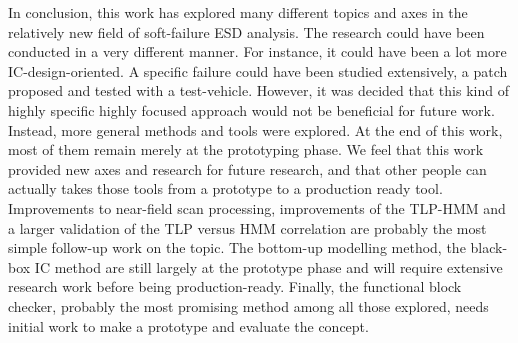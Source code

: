 In conclusion, this work has explored many different topics and axes in the relatively new field of soft-failure ESD analysis.
The research could have been conducted in a very different manner.
For instance, it could have been a lot more IC-design-oriented.
A specific failure could have been studied extensively, a patch proposed and tested with a test-vehicle.
However, it was decided that this kind of highly specific highly focused approach would not be beneficial for future work.
Instead, more general methods and tools were explored.
At the end of this work, most of them remain merely at the prototyping phase.
We feel that this work provided new axes and research for future research, and that other people can actually takes those tools from a prototype to a production ready tool.
Improvements to near-field scan processing, improvements of the TLP-HMM and a larger validation of the TLP versus HMM correlation are probably the most simple follow-up work on the topic.
The bottom-up modelling method, the black-box IC method are still largely at the prototype phase and will require extensive research work before being production-ready.
Finally, the functional block checker, probably the most promising method among all those explored, needs initial work to make a prototype and evaluate the concept.
